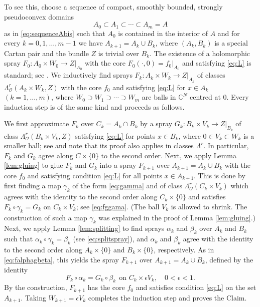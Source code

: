 \documentclass[11pt]{amsart}
\numberwithin{equation}{section}
\theoremstyle{definition}
\newcommand\Oscr{\mathscr{O}}
\newcommand\C{\mathbb{C}}
\begin{document}
To see this, choose a sequence of compact, smoothly bounded, 
strongly pseudoconvex domains 
\[ 
	A_0 \subset A_1 \subset \cdots \subset A_m=A
\]
as in \eqref{eq:sequenceAbis} such that $A_0$ is contained in the interior
of $A$ and for every $k=0,1,\ldots,m-1$ we have 
$A_{k+1}=A_k\cup B_k$, where $(A_k,B_k)$ is a special Cartan pair
and the bundle $Z$ is trivial over $B_k$.  
The existence of a holomorphic spray $F_0:A_0\times W_0\to Z|_{A_0}$
with the core $F_0(\cdotp,0)=f_0|_{A_0}$ and satisfying \eqref{eq:L} 
is standard; see \cite[Proposition 8.10.2]{Forstneric2017E}. 
We inductively find sprays $F_k:A_k\times W_k \to Z|_{A_k}$ 
of classes $\Lambda^r_{\Oscr}(A_k\times W_k,Z)$ with the
core $f_0$ and satisfying \eqref{eq:L} for $x\in A_k$ $(k=1,\ldots,m)$, 
where $W_0\supset W_1\supset\cdots\supset W_m$ 
are balls in $\C^N$ centred at $0$. Every induction 
step is of the same kind and proceeds as follows.

We first approximate $F_k$ over $C_k=A_k\cap B_k$ 
by a spray $G_k:B_k\times V_k \to Z|_{B_k}$ of class 
$\Lambda^r_{\Oscr}(B_k\times V_k,Z)$ satisfying
\eqref{eq:L} for points $x\in B_k$, where $0\in V_k\subset W_k$ 
is a smaller ball; see \cite[Lemma 8.10.3]{Forstneric2017E} and note
that its proof also applies in classes $\Lambda^r$. 
In particular, $F_k$ and $G_k$ agree along  
$C\times \{0\}$ to the second order. Next, we apply 
Lemma \ref{lem:gluing} to glue $F_k$ and $G_k$ 
into a spray $F_{k+1}$ over $A_{k+1}=A_k\cup B_k$
with the core $f_0$ and satisfying condition \eqref{eq:L} for all 
points $x\in A_{k+1}$.
This is done by first finding a map $\gamma_k$
of the form \eqref{eq:gamma} and of class 
$\Lambda^r_\Oscr(C_k\times V_k)$ which agrees with the identity
to the second order along $C_k\times\{0\}$ and satisfies 
$F_k\circ \gamma_k = G_k$ on $C_k\times V_k$; see \eqref{eq:fggama}.
(The ball $V_k$ is allowed to shrink. The construction of such a map 
$\gamma_k$ was explained in the proof of Lemma \ref{lem:gluing}.) 
Next, we apply Lemma \ref{lem:splitting} to 
find sprays $\alpha_k$ and $\beta_k$ over $A_k$ and $B_k$
such that $\alpha_k \circ \gamma_k =\beta_k$ 
(see \eqref{eq:splitspray}),
and $\alpha_k$ and $\beta_k$ agree with the identity to the second
order along $A_k\times \{0\}$ and $B_k\times \{0\}$,
respectively. As in \eqref{eq:falphagbeta}, this yields
the spray $F_{k+1}$ over $A_{k+1}=A_k\cup B_k$, 
defined by the identity
\[
	F_k \circ \alpha_k  = G_k \circ \beta_k  \ \ 
	\text{on $C_k\times \epsilon V_k$},
	\quad 0<\epsilon<1.
\]
By the construction, $F_{k+1}$ has the core $f_0$
and satisfies condition \eqref{eq:L} on the set $A_{k+1}$. 
Taking $W_{k+1}=\epsilon V_k$ completes the induction step 
and proves the Claim. 
\end{document}
